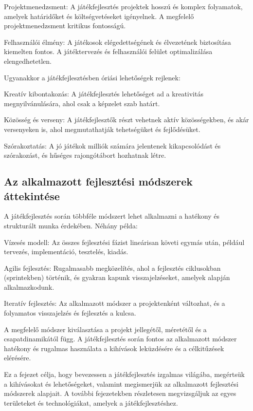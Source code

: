 Projektmenedzsment: A játékfejlesztés projektek hosszú és komplex folyamatok, amelyek határidőket és költségvetéseket igényelnek. A megfelelő projektmenedzsment kritikus fontosságú.

Felhasználói élmény: A játékosok elégedettségének és élvezetének biztosítása kiemelten fontos. A játéktervezés és felhasználói felület optimalizálása elengedhetetlen.

Ugyanakkor a játékfejlesztésben óriási lehetőségek rejlenek:

Kreatív kibontakozás: A játékfejlesztés lehetőséget ad a kreativitás megnyilvánulására, ahol csak a képzelet szab határt.

Közösség és verseny: A játékfejlesztők részt vehetnek aktív közösségekben, és akár versenyeken is, ahol megmutathatják tehetségüket és fejlődésüket.

Szórakoztatás: A jó játékok milliók számára jelentenek kikapcsolódást és szórakozást, és hűséges rajongótábort hozhatnak létre.

\subsection{Az alkalmazott fejlesztési módszerek áttekintése}\cite{HLMMfIS}
A játékfejlesztés során többféle módszert lehet alkalmazni a hatékony és strukturált munka érdekében. Néhány példa:

Vízesés modell: Az összes fejlesztési fázist lineárisan követi egymás után, például tervezés, implementáció, tesztelés, kiadás.

Agilis fejlesztés: Rugalmasabb megközelítés, ahol a fejlesztés ciklusokban (sprintekben) történik, és gyakran kapunk visszajelzéseket, amelyek alapján alkalmazkodunk.

Iteratív fejlesztés: Az alkalmazott módszer a projektenként változhat, és a folyamatos visszajelzés és fejlesztés a kulcsa.

A megfelelő módszer kiválasztása a projekt jellegétől, méretétől és a csapatdinamikától függ. A játékfejlesztés során fontos az alkalmazott módszer hatékony és rugalmas használata a kihívások leküzdésére és a célkitűzések elérésére.

Ez a fejezet célja, hogy bevezessen a játékfejlesztés izgalmas világába, megértsük a kihívásokat és lehetőségeket, valamint megismerjük az alkalmazott fejlesztési módszerek alapjait. A további fejezetekben részletesen megvizsgáljuk az egyes területeket és technológiákat, amelyek a játékfejlesztéshez.


